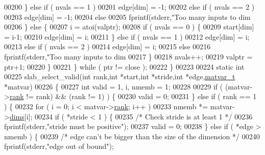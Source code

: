 \begin{DoxyCode}
{{00200                 \} \textcolor{keywordflow}{else} \textcolor{keywordflow}{if} ( nvals == 1 )
00201                     edge[dim] = -1;
00202                 \textcolor{keywordflow}{else} \textcolor{keywordflow}{if} ( nvals == 2 )
00203                     edge[dim] = -1;
00204                 \textcolor{keywordflow}{else}
00205                     fprintf(stderr,\textcolor{stringliteral}{"Too many inputs to dim %
00206             \} \textcolor{keywordflow}{else} \{
00207                 i = atoi(valptr);
00208                 \textcolor{keywordflow}{if} ( nvals == 0 ) \{
00209                     start[dim] = i-1;
00210                     edge[dim]  = i;
00211                 \} \textcolor{keywordflow}{else} \textcolor{keywordflow}{if} ( nvals == 1 )
00212                     edge[dim] = i;
00213                 \textcolor{keywordflow}{else} \textcolor{keywordflow}{if} ( nvals == 2 )
00214                     edge[dim] = i;
00215                 \textcolor{keywordflow}{else}
00216                     fprintf(stderr,\textcolor{stringliteral}{"Too many inputs to dim %
00217             \}
00218             nvals++;
00219             valptr = ptr+1;
00220         \}
00221     \} \textcolor{keywordflow}{while} ( ptr != close );
00222 \}
00223 
00224 \textcolor{keyword}{static} \textcolor{keywordtype}{int}
00225 slab\_select\_valid(\textcolor{keywordtype}{int} rank,\textcolor{keywordtype}{int} *start,\textcolor{keywordtype}{int} *stride,\textcolor{keywordtype}{int} *edge,\hyperlink{group___m_a_t_structmatvar__t}{matvar\_t} *matvar)
00226 \{
00227     \textcolor{keywordtype}{int} valid = 1, i, nmemb = 1;
00228 
00229     \textcolor{keywordflow}{if} ( (matvar->\hyperlink{group___m_a_t_a84ba70c96ded13cc555fa75b768d9921}{rank} != rank) && (rank != 1) ) \{
00230         valid = 0;
00231     \} \textcolor{keywordflow}{else} \textcolor{keywordflow}{if} ( rank == 1 ) \{
00232         \textcolor{keywordflow}{for} ( i = 0; i < matvar->\hyperlink{group___m_a_t_a84ba70c96ded13cc555fa75b768d9921}{rank}; i++ )
00233             nmemb *= matvar->\hyperlink{group___m_a_t_a8e01234e1c862ce3472bb37f5a09b92c}{dims}[i];
00234         if ( *stride < 1 ) \{
00235             \textcolor{comment}{/* Check stride is at least 1 */}
00236             fprintf(stderr,\textcolor{stringliteral}{"stride must be positive"});
00237             valid = 0;
00238         \} \textcolor{keywordflow}{else} \textcolor{keywordflow}{if} ( *edge > nmemb ) \{
00239             \textcolor{comment}{/* edge can't be bigger than the size of the dimension */}
00240             fprintf(stderr,\textcolor{stringliteral}{"edge out of bound"});
}}}}
\end{DoxyCode}
